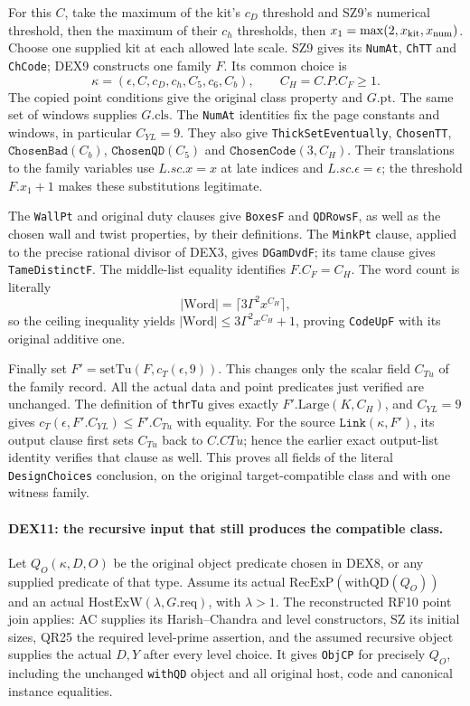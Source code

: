 For this $C$, take the maximum of the kit's $c_D$ threshold and
SZ9's numerical threshold, then the maximum of their $c_h$
thresholds, then $x_1=\max(2,x_{\rm kit},x_{\rm num})$.
Choose one supplied kit at each allowed late scale. SZ9 gives its
\texttt{NumAt}, \texttt{ChTT} and \texttt{ChCode}; DEX9 constructs
one family $F$. Its common choice is
\[
       \kappa=(\epsilon,C,c_D,c_h,C_5,c_6,C_b),
       \qquad C_H=C.P.C_F\ge1.                          \tag{DEX.19}
\]
The copied point conditions give the original class property and
$G.\mathrm{pt}$. The same set of windows supplies $G.\mathrm{cls}$.
The \texttt{NumAt} identities fix the page constants and windows,
in particular $C_{YL}=9$. They also give
\texttt{ThickSetEventually}, \texttt{ChosenTT},
$\texttt{ChosenBad}(C_b)$, $\texttt{ChosenQD}(C_5)$ and
$\texttt{ChosenCode}(3,C_H)$. Their translations to the family
variables use $L.sc.x=x$ at late indices and $L.sc.\epsilon=\epsilon$;
the threshold $F.x_1+1$ makes these substitutions legitimate.

The \texttt{WallPt} and original duty clauses give
\texttt{BoxesF} and \texttt{QDRowsF}, as well as the chosen wall
and twist properties, by their definitions. The \texttt{MinkPt}
clause, applied to the precise rational divisor of DEX3, gives
\texttt{DGamDvdF}; its tame clause gives \texttt{TameDistinctF}.
The middle-list equality identifies $F.C_F=C_H$. The word count
is literally
\[
                 |\mathrm{Word}|=\lceil3\Gamma^2x^{C_H}\rceil,
\]
so the ceiling inequality yields
$|\mathrm{Word}|\le3\Gamma^2x^{C_H}+1$, proving
\texttt{CodeUpF} with its original additive one.

Finally set $F'=\mathrm{setTu}(F,c_T(\epsilon,9))$.
This changes only the scalar field $C_{Tu}$ of the family record.
All the actual data and point predicates just verified are unchanged.
The definition of \texttt{thrTu} gives exactly
$F'.\mathrm{Large}(K,C_H)$, and $C_{YL}=9$ gives
$c_T(\epsilon,F'.C_{YL})\le F'.C_{Tu}$ with equality.
For the source $\texttt{Link}(\kappa,F')$, its output clause first
sets $C_{Tu}$ back to $C.CTu$; hence the earlier exact output-list
identity verifies that clause as well. This proves all fields of
the literal \texttt{DesignChoices} conclusion, on the original
target-compatible class and with one witness family.

\paragraph{DEX11: the recursive input that still produces the compatible class.}
\label{claim:DEX11}
Let $Q_O(\kappa,D,O)$ be the original object predicate chosen in
DEX8, or any supplied predicate of that type. Assume its actual
$\mathrm{RecExP}(\mathrm{withQD}(Q_O))$ and an actual
$\mathrm{HostExW}(\lambda,G.\mathrm{req})$, with $\lambda>1$.
The reconstructed RF10 point join applies: AC supplies its
Harish--Chandra and level constructors, SZ its initial sizes, QR25
the required level-prime assertion, and the assumed recursive
object supplies the actual $D,Y$ after every level choice. It gives
\texttt{ObjCP} for precisely $Q_O$, including the unchanged
\texttt{withQD} object and all original host, code and canonical
instance equalities.

